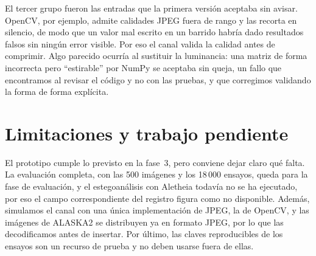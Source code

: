 \documentclass[IB]{TFUOC}%
\begin{document}
El tercer grupo fueron las entradas que la primera versión aceptaba sin avisar. OpenCV, por ejemplo, admite calidades JPEG fuera de rango y las recorta en silencio, de modo que un valor mal escrito en un barrido habría dado resultados falsos sin ningún error visible. Por eso el canal valida la calidad antes de comprimir. Algo parecido ocurría al sustituir la luminancia: una matriz de forma incorrecta pero ``estirable'' por NumPy se aceptaba sin queja, un fallo que encontramos al revisar el código y no con las pruebas, y que corregimos validando la forma de forma explícita.

\section{Limitaciones y trabajo pendiente}
\label{sec:limitaciones_impl}

El prototipo cumple lo previsto en la fase~3, pero conviene dejar claro qué falta. La evaluación completa, con las 500 imágenes y los 18\,000 ensayos, queda para la fase de evaluación, y el estegoanálisis con Aletheia todavía no se ha ejecutado, por eso el campo correspondiente del registro figura como no disponible. Además, simulamos el canal con una única implementación de JPEG, la de OpenCV, y las imágenes de ALASKA2 se distribuyen ya en formato JPEG, por lo que las decodificamos antes de insertar. Por último, las claves reproducibles de los ensayos son un recurso de prueba y no deben usarse fuera de ellas.





\end{document}
